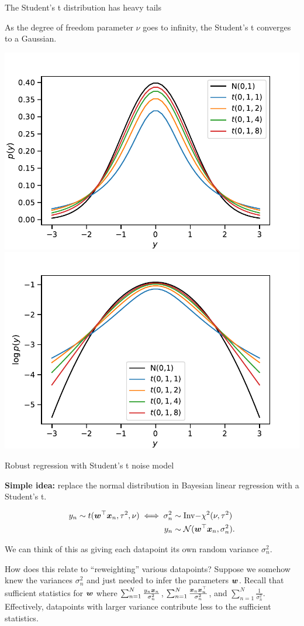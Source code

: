 \documentclass[aspectratio=169]{beamer}
\begin{document}
\begin{frame}{The Student's t distribution has heavy tails}

As the degree of freedom parameter $\nu$ goes to infinity, the Student's t converges to a Gaussian.

\centering
\includegraphics[width=.49\textwidth]{figures/lap3/t_pdf.pdf}
\includegraphics[width=.49\textwidth]{figures/lap3/t_logpdf.pdf}    

\end{frame}

\begin{frame}{Robust regression with Student's t noise model}

\textbf{Simple idea: } replace the normal distribution in Bayesian linear regression with a Student's t.

\begin{align}
    y_n \sim t(\boldsymbol{w}^\top \boldsymbol{x}_n, \tau^2, \nu) \iff 
    \sigma_n^2 &\sim \mathrm{Inv-}\chi^2(\nu, \tau^2)  \\
    y_n &\sim \mathcal{N}(\boldsymbol{w}^\top \boldsymbol{x}_n, \sigma_n^2).
\end{align}

We can think of this as giving each datapoint its own random variance $\sigma_n^2$.

How does this relate to ``reweighting'' various datapoints? Suppose we somehow knew the variances $\sigma_n^2$ and just needed to infer the parameters $\boldsymbol{w}$. Recall that sufficient statistics for $\boldsymbol{w}$ where $\sum_{n=1}^N \frac{y_n \boldsymbol{x}_n}{\sigma_n^2}$, $\sum_{n=1}^N \frac{\boldsymbol{x}_n \boldsymbol{x}_n^\top }{\sigma_n^2}$, and $\sum_{n=1}^N \frac{1}{\sigma_n^2}$. Effectively, datapoints with larger variance contribute less to the sufficient statistics.

\end{frame}
\end{document}
